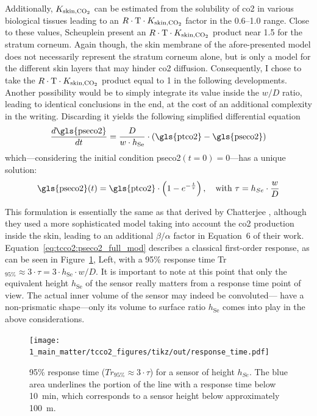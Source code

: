 Additionally, $K_\text{skin,\ce{CO_2}}$ can be estimated from the solubility of \gls{co2} in various biological tissues\cite{wright1934, nichols1957, scheuplein1976, gill1988} leading to an $R\cdot \text{T}\cdot K_\text{skin,\ce{CO_2}}$ factor in the 0.6--1.0 range. Close to these values, Scheuplein \etal{}\cite{scheuplein1976} present an $R\cdot \text{T}\cdot K_\text{skin,\ce{CO_2}}$ product near 1.5 for the stratum corneum. Again though, the skin membrane of the afore-presented model does not necessarily represent the stratum corneum alone, but is only a model for the different skin layers that may hinder \gls{co2} diffusion. Consequently, I chose to take the $R\cdot \text{T}\cdot K_\text{skin,\ce{CO_2}}$ product equal to 1 in the following developments. Another possibility would be to simply integrate its value inside the $w/D$ ratio, leading to identical conclusions in the end, at the cost of an additional complexity in the writing. Discarding it yields the following simplified differential equation
\begin{equation}
	\frac{d \text{\gls{pseco2}}}{dt} = \frac{D}{w \cdot h_\text{Se}} \cdot \left( \text{\gls{ptco2}} - \text{\gls{pseco2}} \right)
\end{equation}
which---considering the initial condition \gls{pseco2}$(t=0)=0$---has a unique solution:
\begin{equation}\label{eq:tcco2:pseco2_full_mod}
	\text{\gls{pseco2}}(t) = \text{\gls{ptco2}} \cdot \left( 1 - e^{-\frac{t}{\tau}} \right), \quad \text{with } \tau = h_{Se} \cdot \frac{w}{D}
\end{equation}

This formulation is essentially the same as that derived by Chatterjee \etal{}\cite{chatterjee2015}, although they used a more sophisticated model taking into account the \gls{co2} production inside the skin, leading to an additional $\beta/\alpha$ factor in Equation~6 of their work. Equation~\ref{eq:tcco2:pseco2_full_mod} describes a classical first-order response, as can be seen in Figure~\ref{fig:tcco2:response_time}, Left, with a 95\% response time Tr$_{95\%}\approx 3\cdot \tau = 3 \cdot h_\text{Se} \cdot w / D$. It is important to note at this point that only the equivalent height $h_\text{Se}$ of the sensor really matters from a response time point of view. The actual inner volume of the sensor may indeed be convoluted---\ie{} have a non-prismatic shape---only its volume to surface ratio $h_\text{Se}$ comes into play in the above considerations.

\begin{figure}
	\centering
	\texttt{[image: 1\_main\_matter/tcco2\_figures/tikz/out/response\_time.pdf]}
	\caption[Influence of a transcutaneous sensor's height on its response time.]{95\% response time ($Tr_{95\%} \approx 3\cdot \tau$) for a sensor of height $h_{Se}$. The blue area underlines the portion of the line with a response time below 10~min, which corresponds to a sensor height below approximately 100~\textmu{}m.}
	\label{fig:tcco2:response_time}
\end{figure}


